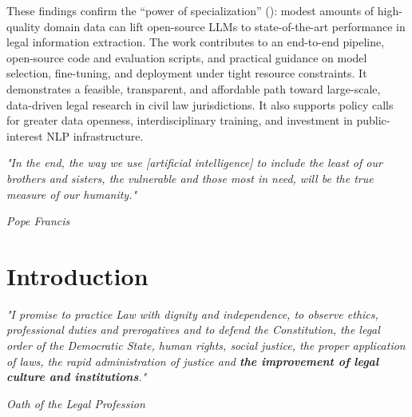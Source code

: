 \documentclass[
  12pt,
]{article}
\begin{document}
These findings confirm the ``power of specialization''
(): modest amounts of high-quality domain data can lift open-source
LLMs to state-of-the-art performance in legal information extraction.
The work contributes to an end-to-end pipeline, open-source code and
evaluation scripts, and practical guidance on model selection,
fine-tuning, and deployment under tight resource constraints. It
demonstrates a feasible, transparent, and affordable path toward
large-scale, data-driven legal research in civil law jurisdictions. It
also supports policy calls for greater data openness, interdisciplinary
training, and investment in public-interest NLP infrastructure.

\newpage{}

\tableofcontents
\newpage
\listoffigures
\newpage
\listoftables
\thispagestyle{empty}
\newpage
\thispagestyle{empty}
\vspace*{\fill}
\begin{flushright}
\begin{minipage}{0.45\textwidth}
\singlespacing
\justifying
\textit{\fontsize{10}{12}\selectfont
"In the end, the way we use [artificial intelligence] to include the least of our brothers and sisters, the vulnerable and those most in need, will be the true measure of our humanity."
}

\vspace{1ex}
\begin{flushright}
\textit{Pope Francis\footnotemark}
\end{flushright}
\end{minipage}
\end{flushright}

\vspace*{0pt}
\newpage

\section{Introduction}\label{sec-introduction}

\vspace*{\fill}
\noindent\hfill
\begin{minipage}{0.50\textwidth}
\singlespacing
\justifying
\textit{\fontsize{10}{12}\selectfont"I promise to practice Law with dignity and independence, to observe ethics, professional duties and prerogatives and to defend the Constitution, the legal order of the Democratic State, human rights, social justice, the proper application of laws, the rapid administration of justice and \textbf{the improvement of legal culture and institutions}."
}
\vspace{1ex}
\begin{flushright}
\textit{Oath of the Legal Profession\footnotemark}
\end{flushright}
\end{minipage}
\end{document}

